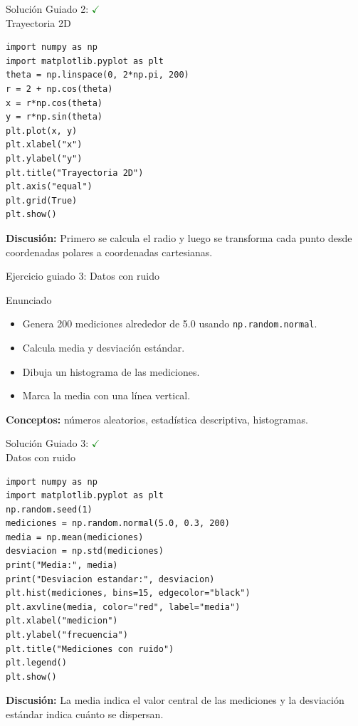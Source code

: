 \documentclass[10pt]{beamer}
\begin{document}
\begin{solutionblock}
\begin{frame}[fragile]{Solución Guiado 2: \hfill \textcolor{green}{$\checkmark$} \\ Trayectoria 2D}
\begin{verbatim}
import numpy as np
import matplotlib.pyplot as plt
theta = np.linspace(0, 2*np.pi, 200)
r = 2 + np.cos(theta)
x = r*np.cos(theta)
y = r*np.sin(theta)
plt.plot(x, y)
plt.xlabel("x")
plt.ylabel("y")
plt.title("Trayectoria 2D")
plt.axis("equal")
plt.grid(True)
plt.show()
\end{verbatim}
\textbf{Discusión:} Primero se calcula el radio y luego se transforma cada punto desde coordenadas polares a coordenadas cartesianas.
\end{frame}
\end{solutionblock}

\begin{frame}{Ejercicio guiado 3: Datos con ruido}
\begin{block}{Enunciado}
\begin{itemize}
  \item Genera 200 mediciones alrededor de 5.0 usando \texttt{np.random.normal}.
  \item Calcula media y desviación estándar.
  \item Dibuja un histograma de las mediciones.
  \item Marca la media con una línea vertical.
\end{itemize}
\end{block}
\textbf{Conceptos:} números aleatorios, estadística descriptiva, histogramas.
\end{frame}

\begin{solutionblock}
\begin{frame}[fragile]{Solución Guiado 3: \hfill \textcolor{green}{$\checkmark$} \\ Datos con ruido}
\begin{verbatim}
import numpy as np
import matplotlib.pyplot as plt
np.random.seed(1)
mediciones = np.random.normal(5.0, 0.3, 200)
media = np.mean(mediciones)
desviacion = np.std(mediciones)
print("Media:", media)
print("Desviacion estandar:", desviacion)
plt.hist(mediciones, bins=15, edgecolor="black")
plt.axvline(media, color="red", label="media")
plt.xlabel("medicion")
plt.ylabel("frecuencia")
plt.title("Mediciones con ruido")
plt.legend()
plt.show()
\end{verbatim}
\textbf{Discusión:} La media indica el valor central de las mediciones y la desviación estándar indica cuánto se dispersan.
\end{frame}
\end{solutionblock}
\end{document}
